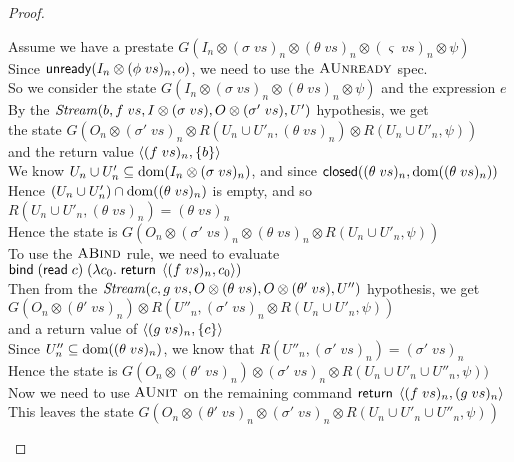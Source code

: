 \begin{proof}
\begin{enumerate}
\begin{tabbedproof}
  \ooo Assume we have a prestate $G(I_n \otimes (\sigma\;vs)_n \otimes (\theta\;vs)_n \otimes (\varsigma\;vs)_n \otimes \psi )$ \\
  \ooo Since $\mathsf{unready}({I_n \otimes (\phi\;vs)_n}, {o})$, we need to use the $\textsc{AUnready}$ spec. \\
  \ooo So we consider the state $G(I_n \otimes (\sigma\;vs)_n \otimes (\theta\;vs)_n \otimes \psi)$ and the expression $e$ \\
  \ooo By the $\mathit{Stream}(b, f\;vs, I \otimes (\sigma\;vs), O \otimes (\sigma'\;vs), U')$ hypothesis, we get \\
  \ooo the state $G(O_n \otimes (\sigma'\;vs)_n \otimes R(U_n \cup U'_n, (\theta\;vs)_n) \otimes R(U_n \cup U'_n, \psi))$ \\
  \ooo and the return value $\left<{(f\;vs)_n},{\{{b}\}}\right>$ \\ 
  \ooo We know $U_n \cup U'_n \subseteq \mbox{dom}({I_n \otimes (\sigma\;vs)_n})$, and since $\mathsf{closed}({(\theta\;vs)_n}, {\mbox{dom}({(\theta\;vs)_n})})$ \\
  \ooo Hence $(U_n \cup U'_n) \cap \mbox{dom}({(\theta\;vs)_n})$ is empty, and so $R(U_n \cup U'_n, (\theta\;vs)_n) = (\theta\;vs)_n$ \\
  \ooo Hence the state is $G(O_n \otimes (\sigma'\;vs)_n \otimes (\theta\;vs)_n \otimes R(U_n \cup U'_n, \psi))$ \\ 
  \ooo To use the $\textsc{ABind}$ rule, we need to evaluate $\mathsf{bind}\; (\mathsf{read}\; c)\;(\lambda c_0.\;\mathsf{return}\;\left<{(f\;vs)_n},{c_0}\right>)$ \\
  \ooo Then from the $\mathit{Stream}(c, g\;vs, O \otimes (\theta\;vs), O \otimes (\theta'\;vs), U'')$ hypothesis, we get \\
  \ooo $G(O_n \otimes (\theta'\;vs)_n) \otimes R(U''_n, (\sigma'\;vs)_n \otimes R(U_n \cup U'_n, \psi))$ \\ 
  \ooo and a return value of $\left<{(g\;vs)_n},{\{{c}\}}\right>$ \\ 
  \ooo Since $U''_n \subseteq \mbox{dom}({(\theta\;vs)_n})$, we know that $R(U''_n, (\sigma'\;vs)_n) = (\sigma'\;vs)_n$ \\ 
  \ooo Hence the state is $G(O_n \otimes (\theta'\;vs)_n) \otimes (\sigma'\;vs)_n \otimes R(U_n \cup U'_n \cup U''_n, \psi))$ \\ 
  \ooo Now we need to use $\textsc{AUnit}$ on the remaining command $\mathsf{return}\; \left<{(f\;vs)_n},{(g\;vs)_n}\right>$ \\ 
  \ooo This leaves the state $G(O_n \otimes (\theta'\;vs)_n \otimes (\sigma'\;vs)_n \otimes R(U_n \cup U'_n \cup U''_n, \psi))$ \\ 

\end{tabbedproof}
\end{enumerate}
\end{proof}
